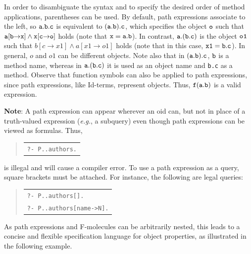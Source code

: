 \documentclass[11pt]{article}
\newenvironment{qrules}{\begin{quote}\tt\begin{tabular}[t]{l}}%
{\end{tabular}\end{quote}}
\newcommand{\fd}{\ensuremath{{\rightarrow}}}                   %
\begin{document}
In order to disambiguate the syntax and to specify the desired order of
method applications, parentheses can be used. By default, path expressions
associate to the left, so $\tt a.b.c$ is equivalent to $\tt (a.b).c$, which
specifies the object $\tt o$ such that $\tt a[b\fd x] \land x[c\fd o]$
holds (note that $\tt x=a.b$). In contrast, $\tt a.(b.c)$ is the object
$\tt o1$ such that $b[c\fd x1] \land a[x1\fd o1]$ holds (note that in this
case, $\tt x1=b.c$). In general, $o$ and $o1$ can be different objects.
Note also that in $\tt (a.b).c$, $\tt b$ is a method name, whereas in $\tt
a.(b.c)$ it is used as an object name and {\tt b.c} as a method.  Observe
that function symbols can also be applied to path expressions, since path
expressions, like Id-terms, represent objects. Thus, $\tt f(a.b)$
is a valid expression.

{\bf Note}: A path expression can appear wherever an oid can, but not in
place of a truth-valued expression ({\it e.g.}, a subquery) even though
path expressions can be viewed as formulas. Thus,
\begin{qrules}
\tt ?- P..authors.
\end{qrules}
is illegal and will cause a compiler error. To use a path expression as a
query, square brackets must be attached. For instance, the following are
legal queries:
\begin{qrules}
   \tt ?- P..authors[]. \\
   \tt ?- P..authors[name->N].
\end{qrules}

As path expressions and F-molecules can be arbitrarily nested, this leads
to a concise and flexible specification language for object properties, as
illustrated in the following example.
\end{document}
